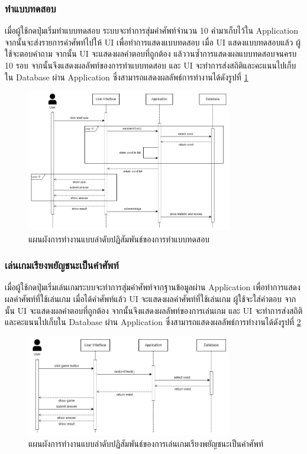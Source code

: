 \documentclass[12pt,oneside,openright,a4paper]{cpe-thai-project}
\begin{document}
\pagebreak
\subsubsection{ทำแบบทดสอบ}
\hspace{1cm}
เมื่อผู้ใช้กดปุ่มเริ่มทำแบบทดสอบ ระบบจะทำการสุ่มคำศัพท์จำนวน 10 คำมาเก็บไว้ใน Application จากนั้นจะส่งรายการคำศัพท์ไปให้ UI เพื่อทำการแสดงแบบทดสอบ
เมื่อ UI แสดงแบบทดสอบแล้ว ผู้ใช้จะตอบคำถาม จากนั้น UI จะแสดงผลคำตอบที่ถูกต้อง แล้ววนซ้ำการแสดงผลแบบทดสอบจนครบ 10 รอบ จากนั้นจึงแสดงผลลัพท์ของการทำแบบทดสอบ
และ UI จะทำการส่งสถิติและคะแนนไปเก็บใน Database ผ่าน Application ซึ่งสามารถแสดงผลลัพธ์การทำงานได้ดังรูปที่ \ref{fig:S_Quiz}
\begin{figure}[!h]\centering
	\includegraphics[width=0.8\textwidth, keepaspectratio=true]{image/chap3/sequence/Quiz.jpg}
	\caption{แผนผังการทำงานแบบลำดับปฏิสัมพันธ์ของการทำแบบทดสอบ}\label{fig:S_Quiz}
\end{figure}

\pagebreak
\subsubsection{เล่นเกมเรียงพยัญชนะเป็นคำศัพท์}
\hspace{1cm}
เมื่อผู้ใช้กดปุ่มเริ่มเล่นเกมระบบจะทำการสุ่มคำศัพท์จากฐานข้อมูลผ่าน Application เพื่อทำการแสดงผลคำศัพท์ที่ใช้เล่นเกม เมื่อได้คำศัพท์แล้ว
UI จะแสดงผลคำศัพท์ที่ใช้เล่นเกม ผู้ใช้จะใส่คำตอบ จากนั้น UI จะแสดงผลคำตอบที่ถูกต้อง จากนั้นจึงแสดงผลลัพท์ของการเล่นเกม
และ UI จะทำการส่งสถิติและคะแนนไปเก็บใน Database ผ่าน Application ซึ่งสามารถแสดงผลลัพธ์การทำงานได้ดังรูปที่ \ref{fig:S_Game}
\begin{figure}[!h]\centering
	\includegraphics[width=0.8\textwidth, keepaspectratio=true]{image/chap3/sequence/Game.jpg}
	\caption{แผนผังการทำงานแบบลำดับปฏิสัมพันธ์ของการเล่นเกมเรียงพยัญชนะเป็นคำศัพท์}\label{fig:S_Game}
\end{figure}
\end{document}
